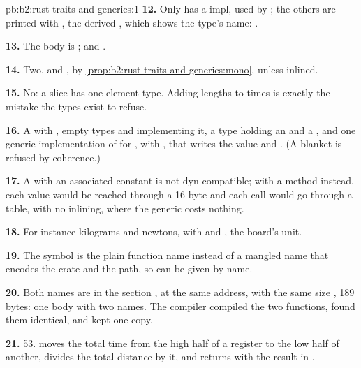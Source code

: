 \begin{solution}{pb:b2:rust-traits-and-generics:1}
\textbf{12.} Only  has a  impl, used by ; the others are printed with
, the derived , which shows the type's name: .

\textbf{13.} The body is ;  and
.

\textbf{14.} Two,  and , by
\cref{prop:b2:rust-traits-and-generics:mono}, unless inlined.

\textbf{15.} No: a slice has one element type. Adding lengths to times is exactly the mistake the types exist to
refuse.

\textbf{16.} A   with , empty types  and 
implementing it, a type  holding an  and a , and one
generic implementation of  for , with , that writes the value and . (A blanket  is refused by
coherence.)

\textbf{17.} A  with an associated constant is not dyn compatible; with a method 
instead, each value would be reached through a 16-byte  and each call would go through a table, with no
inlining, where the generic costs nothing.

\textbf{18.} For instance kilograms and newtons, with  and
, the board's unit.

\textbf{19.} The symbol is the plain function name instead of a mangled name that encodes the crate and the path, so
 can be given  by name.

\textbf{20.} Both names are in the section , at the same address, with the same size
, 189 bytes: one body with two names. The compiler compiled the two functions, found them identical, and
kept one copy.

\textbf{21.} 53.  moves the total time from the high half of a register to the low half of another,
 divides the total distance by it, and  returns with the result in .


\end{solution}
